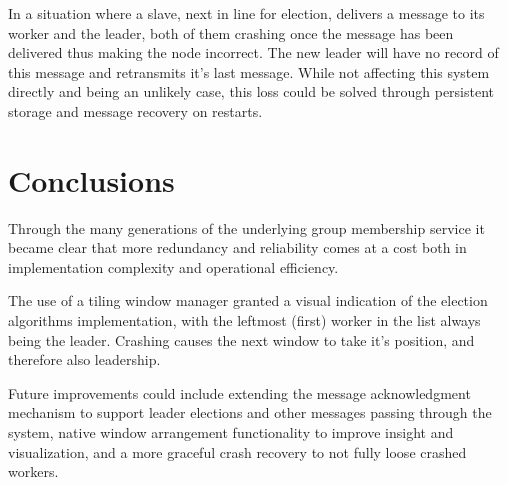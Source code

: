 \documentclass[a4paper, 11pt]{article}
\begin{document}

In a situation where a slave, next in line for election, delivers a message to its worker and the leader, both of them crashing once the message has been delivered thus making the node incorrect.
The new leader will have no record of this message and retransmits it's last message. While not affecting this system directly and being an unlikely case, this loss could be solved through persistent storage and message recovery on restarts.

\section{Conclusions}

Through the many generations of the underlying group membership service it became clear that more redundancy and reliability comes at a cost both in implementation complexity and operational efficiency.

The use of a tiling window manager granted a visual indication of the election algorithms implementation, with the leftmost (first) worker in the list always being the leader. Crashing causes the next window to take it's position, and therefore also leadership.

Future improvements could include extending the message acknowledgment mechanism to support leader elections and other messages passing through the system,
native window arrangement functionality to improve insight and visualization, and a more graceful crash recovery to not fully loose crashed workers.
\end{document}
